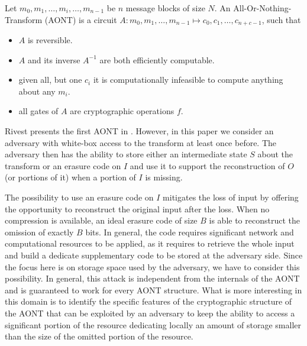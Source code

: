 \begin{defn}
Let $m_0, m_1, \ldots, m_i, \ldots, m_{n-1}$ be $n$ message blocks of size $N$.
An All-Or-Nothing-Transform (AONT) is a circuit $A: m_0, m_1, \ldots, m_{n-1} \mapsto c_0, c_1, \ldots, c_{n+c-1}$, such that

\begin{itemize}

\item $A$ is reversible.

\item $A$ and its inverse $A^{-1}$ are both efficiently computable.

\item given all, but one $c_i$ it is computationally infeasible to compute anything about any $m_i$.

\item all gates of $A$ are cryptographic operations $f$.

\end{itemize}

\end{defn}

Rivest presents the first AONT in \cite{r97}.
However, in this paper we consider an adversary with white-box access to the transform at least once before.
The adversary then has the ability to store either an intermediate state $S$ about the transform or an erasure code on $I$ and use it to support the reconstruction of $O$ (or portions of it) when a portion of $I$ is missing.

The possibility to use an erasure code on $I$ mitigates the loss of input by offering the opportunity to reconstruct the original input after the loss. When no compression is available, an ideal erasure code of size $B$ is able to reconstruct the omission of exactly $B$ bits. In general, the code requires significant network and computational resources to be applied, as it requires to retrieve the whole input and build a dedicate supplementary code to be stored at the adversary side. Since the focus here is on storage space used by the adversary, we have to consider this possibility. In general, this attack is independent from the internals of the AONT and is guaranteed to work for every AONT structure. What is more interesting in this domain is to identify the specific features of the cryptographic structure of the AONT that can be exploited by an adversary to keep the ability to access a significant portion of the resource dedicating locally an amount of storage smaller than the size of the omitted portion of the resource.

